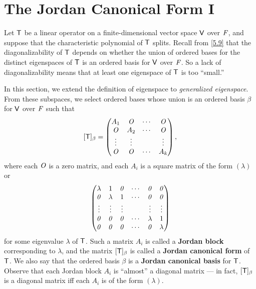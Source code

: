 \section{The Jordan Canonical Form I}\label{sec:7.1}

\begin{defn}\label{7.1.1}
  Let \(\mathsf{T}\) be a linear operator on a finite-dimensional vector space \(\mathsf{V}\) over \(\mathit{F}\), and suppose that the characteristic polynomial of \(\mathsf{T}\) splits.
  Recall from \cref{5.9} that the diagonalizability of \(\mathsf{T}\) depends on whether the union of ordered bases for the distinct eigenspaces of \(\mathsf{T}\) is an ordered basis for \(\mathsf{V}\) over \(\mathit{F}\).
  So a lack of diagonalizability means that at least one eigenspace of \(\mathsf{T}\) is too ``small.''

  In this section, we extend the definition of eigenspace to \emph{generalized eigenspace}.
  From these subspaces, we select ordered bases whose union is an ordered basis \(\beta\) for \(\mathsf{V}\) over \(\mathit{F}\) such that
  \[
    [\mathsf{T}]_{\beta} = \begin{pmatrix}
      A_1    & \mathit{O}    & \cdots & \mathit{O}    \\
      \mathit{O}    & A_2    & \cdots & \mathit{O}    \\
      \vdots & \vdots &        & \vdots \\
      \mathit{O}    & \mathit{O}    & \cdots & A_k
    \end{pmatrix},
  \]
  where each \(\mathit{O}\) is a zero matrix, and each \(A_i\) is a square matrix of the form \((\lambda)\) or
  \[
    \begin{pmatrix}
      \lambda & 1       & \mathit{0}    & \cdots & \mathit{0}     & \mathit{0}     \\
      \mathit{0}     & \lambda & 1      & \cdots & \mathit{0}     & \mathit{0}     \\
      \vdots  & \vdots  & \vdots &        & \vdots  & \vdots  \\
      \mathit{0}     & \mathit{0}     & \mathit{0}    & \cdots & \lambda & 1       \\
      \mathit{0}     & \mathit{0}     & \mathit{0}    & \cdots & \mathit{0}     & \lambda
    \end{pmatrix}
  \]
  for some eigenvalue \(\lambda\) of \(\mathsf{T}\).
  Such a matrix \(A_i\) is called a \textbf{Jordan block} corresponding to \(\lambda\), and the matrix \([\mathsf{T}]_{\beta}\) is called a \textbf{Jordan canonical form} of \(\mathsf{T}\).
  We also say that the ordered basis \(\beta\) is a \textbf{Jordan canonical basis} for \(\mathsf{T}\).
  Observe that each Jordan block \(A_i\) is ``almost'' a diagonal matrix
  ---
  in fact, \([\mathsf{T}]_{\beta}\) is a diagonal matrix iff each \(A_i\) is of the form \((\lambda)\).
\end{defn}

